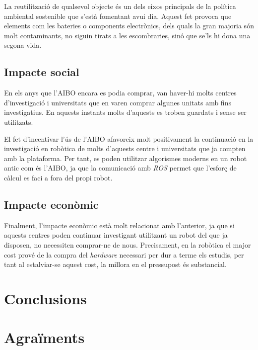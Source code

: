\documentclass[12pt,a4paper,final,twoside]{report}
\begin{document}
La reutilització de qualsevol objecte és un dels eixos principals de la política ambiental sostenible que s'està fomentant avui dia. Aquest fet provoca que elements com les bateries o components electrònics, dels quals la gran majoria són molt contaminants, no siguin tirats a les escombraries, sinó que se'ls hi dona una segona vida.


\section{Impacte social}

En els anys que l'AIBO encara es podia comprar, van haver-hi molts centres d'investigació i universitats que en varen comprar algunes unitats amb fins investigatius. En aquests instants molts d'aquests es troben guardats i sense ser utilitzats.

El fet d'incentivar l'ús de l'AIBO afavoreix molt positivament la continuació en la investigació en robòtica de molts d'aquests centre i universitats que ja compten amb la plataforma. Per tant, es poden utilitzar algorismes moderns en un robot antic com és l'AIBO, ja que la comunicació amb \textit{ROS} permet que l'esforç de càlcul es faci a fora del propi robot.

\section{Impacte econòmic}

Finalment, l'impacte econòmic està molt relacionat amb l'anterior, ja que si aquests centres poden continuar investigant utilitzant un robot del que ja disposen, no necessiten comprar-ne de nous. Precisament, en la robòtica el major cost prové de la compra del \textit{hardware} necessari per dur a terme els estudis, per tant al estalviar-se aquest cost, la millora en el pressupost és substancial.


\chapter{Conclusions}


\chapter*{Agraïments}
\end{document}
